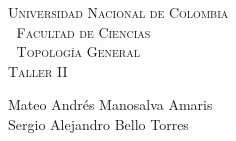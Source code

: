 \documentclass[11pt]{article}
\begin{document}
\setlength{\parindent}{0cm}
\hoffset-0.46cm
\voffset-1.46cm
\begin{window}
\large\scshape \hspace{1.4cm}\textsf{Universidad Nacional de Colombia} \\
\textcolor{white}{\tiny.}  \large \hspace{2.4cm} \textsf{Facultad de Ciencias} \\
\textcolor{white}{\tiny.}   \normalsize\hspace{2.8cm}\textsf{Topología General}\\
\hspace*{3.9cm}\textsf{Taller II}\\
\end{window}
\vspace{0.6cm}
\textsf{Mateo Andrés Manosalva Amaris\\
Sergio Alejandro Bello Torres} 
\normalsize
\dotfill
\vspace{0.7cm}
\end{document}
